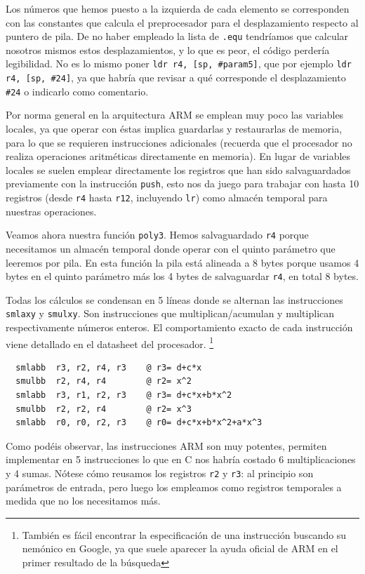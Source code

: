 Los números que hemos puesto a la izquierda de cada elemento se
corresponden con las constantes que calcula el preprocesador para el
desplazamiento respecto al puntero de pila. De no haber empleado la lista
de {\tt .equ} tendríamos que calcular nosotros mismos estos desplazamientos,
y lo que es peor, el código perdería legibilidad. No es lo mismo poner
{\tt ldr r4, [sp, \#param5]}, que por ejemplo {\tt ldr r4, [sp, \#24]}, ya que habría
que revisar a qué corresponde el desplazamiento {\tt \#24} o indicarlo como
comentario.

Por norma general en la arquitectura ARM se emplean muy poco las variables
locales, ya que operar con éstas implica guardarlas y restaurarlas de memoria,
para lo que se requieren instrucciones adicionales (recuerda que el procesador
no realiza operaciones aritméticas directamente en memoria). En lugar de
variables locales se suelen emplear directamente los registros que han sido
salvaguardados previamente con la instrucción {\tt push}, esto nos da juego
para trabajar con hasta 10 registros (desde {\tt r4} hasta {\tt r12},
incluyendo {\tt lr}) como almacén temporal para nuestras operaciones.

Veamos ahora nuestra función {\tt poly3}. Hemos salvaguardado {\tt r4} porque
necesitamos un almacén temporal donde operar con el quinto parámetro que
leeremos por pila. En esta función la pila está alineada a 8 bytes porque
usamos 4 bytes en el quinto parámetro más los 4 bytes de salvaguardar {\tt r4},
en total 8 bytes.

Todas los cálculos se condensan en 5 líneas donde se alternan las instrucciones
{\tt smlaxy} y {\tt smulxy}. Son instrucciones que multiplican/acumulan y
multiplican respectivamente números enteros. El comportamiento exacto de cada
instrucción viene detallado en el datasheet\cite{ATRM} del procesador.
\footnote{
También es fácil encontrar la especificación de una instrucción buscando su
nemónico en Google, ya que suele aparecer la ayuda oficial de ARM en el primer
resultado de la búsqueda}

\begin{lstlisting}
  smlabb  r3, r2, r4, r3    @ r3= d+c*x
  smulbb  r2, r4, r4        @ r2= x^2
  smlabb  r3, r1, r2, r3    @ r3= d+c*x+b*x^2
  smulbb  r2, r2, r4        @ r2= x^3
  smlabb  r0, r0, r2, r3    @ r0= d+c*x+b*x^2+a*x^3
\end{lstlisting}

Como podéis observar, las instrucciones ARM son muy potentes, permiten
implementar en 5 instrucciones lo que en C nos habría costado 6
multiplicaciones y 4 sumas. Nótese cómo reusamos los registros {\tt r2} y {\tt r3}:
al principio son parámetros de entrada, pero luego los empleamos como registros
temporales a medida que no los necesitamos más.

